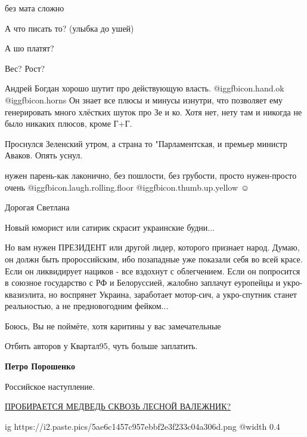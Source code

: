 \begin{itemize}
без мата сложно

А что писать то? (улыбка до ушей)


А шо платят?


Вес? Рост?


Андрей Богдан хорошо шутит про действующую власть. @igg{fbicon.hand.ok}  @igg{fbicon.horns} 
Он знает все плюсы и минусы изнутри, что позволяет ему генерировать много хлёстких шуток про Зе и ко.
Хотя нет, нету там и никогда не было никаких плюсов, кроме Г+Г.


Проснулся Зеленский утром, а страна то "Парламентская, и премьер министр
Аваков. Опять уснул.


нужен парень-как лаконично, без пошлости, без грубости, просто нужен-просто
очень @igg{fbicon.laugh.rolling.floor}  @igg{fbicon.thumb.up.yellow} ☺


Дорогая Светлана

Новый юморист или сатирик скрасит украинские будни...

Но вам нужен ПРЕЗИДЕНТ или другой лидер, которого признает народ. Думаю, он
должн быть пророссийским, ибо позападные уже показали себя во всей красе. Если
он ликвидирует нациков - все вздохнут с облегчением. Если он попросится в
союзное государство с РФ и Белоруссией, жалобно заплачут еуропейцы и
укро-квазиэлита, но воспрянет Украина, заработает мотор-сич, а укро-спутник
станет реальностью, а не предновогодним фейком...

Боюсь, Вы не поймёте, хотя каритины у вас замечательные

Отбить авторов у Квартал95, чуть больше заплатить.

\textbf{Петро Порошенко}


Российское наступление.

\href{https://www.facebook.com/sergio.motorriery/posts/439213217833912}{ПРОБИРАЕТСЯ МЕДВЕДЬ СКВОЗЬ ЛЕСНОЙ ВАЛЕЖНИК?}

\ifcmt
  ig https://i2.paste.pics/5ae6c1457c957ebbf2e3f233c04a306d.png
  @width 0.4
\fi


\end{itemize} %
